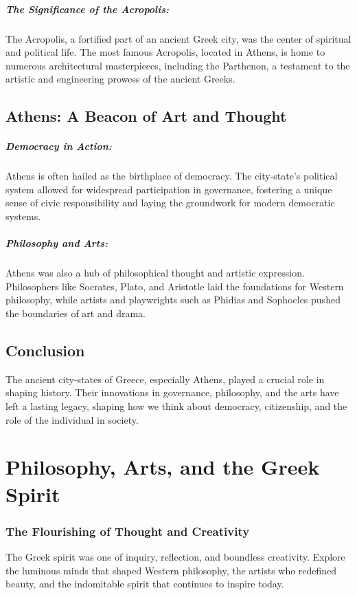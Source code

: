 \documentclass[a4paper,12pt]{book}
\begin{document}
\paragraph{The Significance of the Acropolis:}
The Acropolis, a fortified part of an ancient Greek city, was the center of spiritual and political life. The most famous Acropolis, located in Athens, is home to numerous architectural masterpieces, including the Parthenon, a testament to the artistic and engineering prowess of the ancient Greeks.

\section*{Athens: A Beacon of Art and Thought}

\paragraph{Democracy in Action:}
Athens is often hailed as the birthplace of democracy. The city-state’s political system allowed for widespread participation in governance, fostering a unique sense of civic responsibility and laying the groundwork for modern democratic systems.

\paragraph{Philosophy and Arts:}
Athens was also a hub of philosophical thought and artistic expression. Philosophers like Socrates, Plato, and Aristotle laid the foundations for Western philosophy, while artists and playwrights such as Phidias and Sophocles pushed the boundaries of art and drama.

\section*{Conclusion}

The ancient city-states of Greece, especially Athens, played a crucial role in shaping history. Their innovations in governance, philosophy, and the arts have left a lasting legacy, shaping how we think about democracy, citizenship, and the role of the individual in society.

\chapter{Philosophy, Arts, and the Greek Spirit}
\subsection*{The Flourishing of Thought and Creativity}
The Greek spirit was one of inquiry, reflection, and boundless creativity. Explore the luminous minds that shaped Western philosophy, the artists who redefined beauty, and the indomitable spirit that continues to inspire today.
\end{document}
